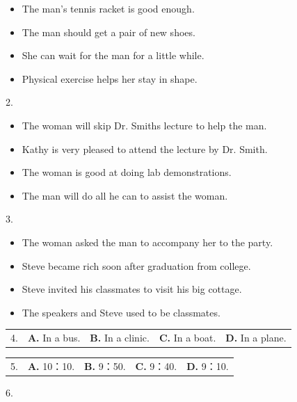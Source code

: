 \documentclass[UTF8,11pt]{ctexart}
\begin{document}
\begin{itemize}[leftmargin=2em,itemsep=.2em,topsep=.4em]\item[A.] The man’s tennis racket is good enough.
\item[B.] The man should get a pair of new shoes.
\item[C.] She can wait for the man for a little while.
\item[D.] Physical exercise helps her stay in shape.
\end{itemize}

2.


\begin{itemize}[leftmargin=2em,itemsep=.2em,topsep=.4em]\item[A.] The woman will skip Dr. Smiths lecture to help the man.
\item[B.] Kathy is very pleased to attend the lecture by Dr. Smith.
\item[C.] The woman is good at doing lab demonstrations.
\item[D.] The man will do all he can to assist the woman.
\end{itemize}

3.


\begin{itemize}[leftmargin=2em,itemsep=.2em,topsep=.4em]\item[A.] The woman asked the man to accompany her to the party.
\item[B.] Steve became rich soon after graduation from college.
\item[C.] Steve invited his classmates to visit his big cottage.
\item[D.] The speakers and Steve used to be classmates.
\end{itemize}

\noindent\begin{tabularx}{\linewidth}{@{}lXXXX@{}}4. & \textbf{A.} In a bus. & \textbf{B.} In a clinic. & \textbf{C.} In a boat. & \textbf{D.} In a plane.\\\end{tabularx}\par

\noindent\begin{tabularx}{\linewidth}{@{}lXXXX@{}}5. & \textbf{A.} 10：10. & \textbf{B.} 9：50. & \textbf{C.} 9：40. & \textbf{D.} 9：10.\\\end{tabularx}\par

6.
\end{document}
